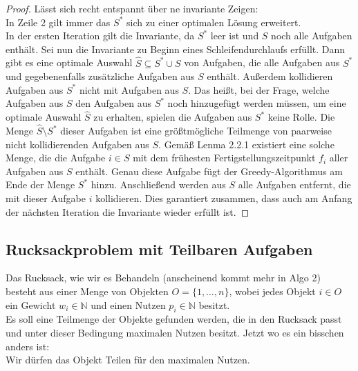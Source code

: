 \documentclass{report}
\begin{document}
\begin{proof}
	Lässt sich recht entspannt über ne invariante Zeigen:\\
	In Zeile 2 gilt immer das $S^{*}$ sich zu einer optimalen Lösung erweitert.\\
	In der ersten Iteration gilt die Invariante, da \( S^* \) leer ist und \( S \) noch alle Aufgaben enthält. Sei nun die Invariante zu Beginn eines Schleifendurchlaufs erfüllt. Dann gibt es eine optimale Auswahl \( \hat{S} \subseteq S^* \cup S \) von Aufgaben, die alle Aufgaben aus \( S^* \) und gegebenenfalls zusätzliche Aufgaben aus \( S \) enthält. Außerdem kollidieren Aufgaben aus \( S^* \) nicht mit Aufgaben aus \( S \). Das heißt, bei der Frage, welche Aufgaben aus \( S \) den Aufgaben aus \( S^* \) noch hinzugefügt werden müssen, um eine optimale Auswahl \( \hat{S} \) zu erhalten, spielen die Aufgaben aus \( S^* \) keine Rolle. Die Menge \( \hat{S} \setminus S^* \) dieser Aufgaben ist eine größtmögliche Teilmenge von paarweise nicht kollidierenden Aufgaben aus \( S \). Gemäß Lenma 2.2.1 existiert eine solche Menge, die die Aufgabe \( i \in S \) mit dem frühesten Fertigstellungszeitpunkt \( f_i \) aller Aufgaben aus \( S \) enthält. Genau diese Aufgabe fügt der Greedy-Algorithmus am Ende der Menge \( S^* \) hinzu. Anschließend werden aus \( S \) alle Aufgaben entfernt, die mit dieser Aufgabe \( i \) kollidieren. Dies garantiert zusammen, dass auch am Anfang der nächsten Iteration die Invariante wieder erfüllt ist.
\end{proof}
\subsection{Rucksackproblem mit Teilbaren Aufgaben}
Das Rucksack, wie wir es Behandeln (anscheinend kommt mehr in Algo 2) besteht aus einer Menge von Objekten $O = \{1, \dots, n\}$, wobei jedes Objekt $i \in O$ ein Gewicht $w_{i} \in \mathbb{N}$ und einen Nutzen $p_{i} \in \mathbb{N}$ besitzt.\\
Es soll eine Teilmenge der Objekte gefunden werden, die in den Rucksack passt und unter dieser Bedingung maximalen Nutzen besitzt.
Jetzt wo es ein bisschen anders ist: \\ Wir dürfen das Objekt Teilen für den maximalen Nutzen.
\end{document}
